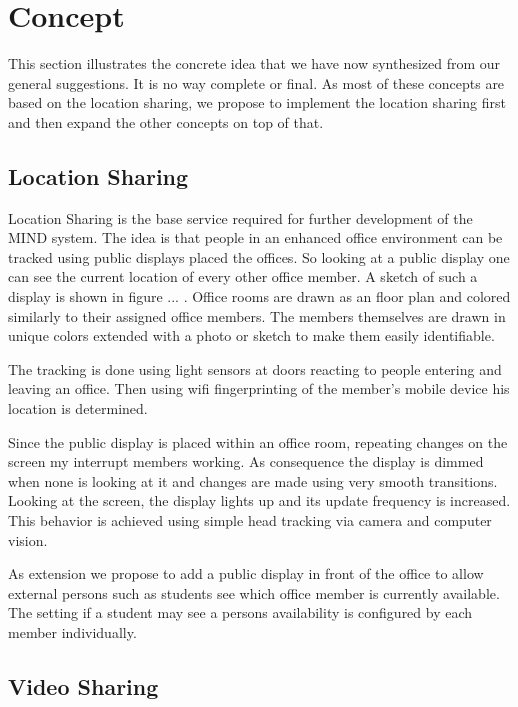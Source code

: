 \section{Concept}

This section illustrates the concrete idea that we have now synthesized from our general suggestions.
It is no way complete or final.
As most of these concepts are based on the location sharing, we propose to implement the location sharing first and then expand the other concepts on top of that.

\subsection{Location Sharing}
\label{location_sharing}
Location Sharing is the base service required for further development of the MIND system.
The idea is that people in an enhanced office environment can be tracked using public displays placed the offices.
So looking at a public display one can see the current location of every other office member.
A sketch of such a display is shown in figure ... .
Office rooms are drawn as an floor plan and colored similarly to their assigned office members.
The members themselves are drawn in unique colors extended with a photo or sketch to make them easily identifiable.

The tracking is done using light sensors at doors reacting to people entering and leaving an office.
Then using wifi fingerprinting of the member's mobile device his location is determined.

Since the public display is placed within an office room, repeating changes on the screen my interrupt members working.
As consequence the display is dimmed when none is looking at it and changes are made using very smooth transitions.
Looking at the screen, the display lights up and its update frequency is increased.
This behavior is achieved using simple head tracking via camera and computer vision.



As extension we propose to add a public display in front of the office to allow external persons such as students see which office member is currently available.
The setting if a student may see a persons availability is configured by each member individually.



\subsection{Video Sharing}


